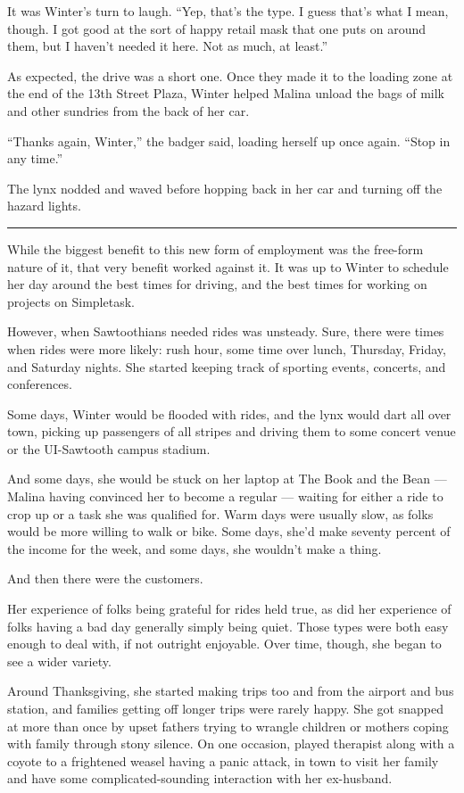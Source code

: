 It was Winter's turn to laugh. ``Yep, that's the type. I guess that's what I mean, though. I got good at the sort of happy retail mask that one puts on around them, but I haven't needed it here. Not as much, at least.''

As expected, the drive was a short one. Once they made it to the loading zone at the end of the 13th Street Plaza, Winter helped Malina unload the bags of milk and other sundries from the back of her car.

``Thanks again, Winter,'' the badger said, loading herself up once again. ``Stop in any time.''

The lynx nodded and waved before hopping back in her car and turning off the hazard lights.

\begin{center}\rule{0.5\linewidth}{0.5pt}\end{center}

While the biggest benefit to this new form of employment was the free-form nature of it, that very benefit worked against it. It was up to Winter to schedule her day around the best times for driving, and the best times for working on projects on Simpletask.

However, when Sawtoothians needed rides was unsteady. Sure, there were times when rides were more likely: rush hour, some time over lunch, Thursday, Friday, and Saturday nights. She started keeping track of sporting events, concerts, and conferences.

Some days, Winter would be flooded with rides, and the lynx would dart all over town, picking up passengers of all stripes and driving them to some concert venue or the UI-Sawtooth campus stadium.

And some days, she would be stuck on her laptop at The Book and the Bean --- Malina having convinced her to become a regular --- waiting for either a ride to crop up or a task she was qualified for. Warm days were usually slow, as folks would be more willing to walk or bike. Some days, she'd make seventy percent of the income for the week, and some days, she wouldn't make a thing.

And then there were the customers.

Her experience of folks being grateful for rides held true, as did her experience of folks having a bad day generally simply being quiet. Those types were both easy enough to deal with, if not outright enjoyable. Over time, though, she began to see a wider variety.

Around Thanksgiving, she started making trips too and from the airport and bus station, and families getting off longer trips were rarely happy. She got snapped at more than once by upset fathers trying to wrangle children or mothers coping with family through stony silence. On one occasion, played therapist along with a coyote to a frightened weasel having a panic attack, in town to visit her family and have some complicated-sounding interaction with her ex-husband.

